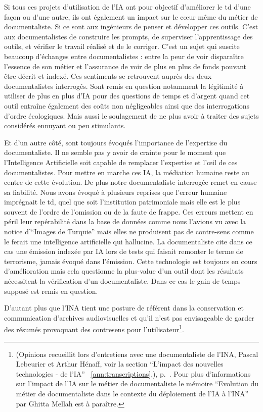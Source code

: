 
Si tous ces projets d'utilisation de l'IA ont pour objectif d'améliorer le \gls{td} d'une façon ou d'une autre, ils ont également un impact sur le cœur même du métier de documentaliste. Si ce sont aux ingénieurs de penser et développer ces outils. C'est aux documentalistes de construire les prompts, de superviser l'apprentissage des outils, et vérifier le travail réalisé et de le corriger. C'est un sujet qui suscite beaucoup d'échanges entre documentalistes : entre la peur de voir disparaître l'essence de son métier et l'assurance de voir de plus en plus de fonds pouvant être décrit et indexé. Ces sentiments se retrouvent auprès des deux documentalistes interrogés. Sont remis en question notamment la légitimité à utiliser de plus en plus d'IA pour des questions de temps et d'argent quand cet outil entraîne également des coûts non négligeables ainsi que des interrogations d'ordre écologiques. Mais aussi le soulagement de ne plus avoir à traiter des sujets considérés ennuyant ou peu stimulants. 

Et d'un autre côté, sont toujours évoqués l'importance de l'expertise du documentaliste. Il ne semble pas y avoir de crainte pour le moment que l'Intelligence Artificielle soit capable de remplacer l'expertise et l’œil de ces documentalistes. Pour mettre en marche ces IA, la médiation humaine reste au centre de cette évolution. De plus notre documentaliste interrogée remet en cause sa fiabilité. Nous avons évoqué à plusieurs reprises que l'erreur humaine imprégnait le \gls{td}, quel que soit l'institution patrimoniale mais elle est le plus souvent de l'ordre de l'omission ou de la faute de frappe. Ces erreurs mettent en péril leur repérabilité dans la base de données comme nous l'avions vu avec la notice d'\enquote{Images de Turquie} mais elles ne produisent pas de contre-sens comme le ferait une intelligence artificielle qui hallucine. La documentaliste cite dans ce cas une émission indexée par IA lors de tests qui faisait remonter le terme de terrorisme, jamais évoqué dans l'émission. Cette technologie est toujours en cours d'amélioration mais cela questionne la plus-value d'un outil dont les résultats nécessitent la vérification d'un documentaliste. Dans ce cas le gain de temps supposé est remis en question. 

D'autant plus que l'INA tient une posture de référent dans la conservation et communication d'archives audiovisuelles et qu'il n'est pas envisageable de garder des résumés provoquant des contresens pour l'utilisateur\footnote{(Opinions recueillit lors d'entretiens avec une documentaliste de l'INA, Pascal Lebeurier et Arthur Hénaff, voir la section \enquote{L'impact des nouvelles technologies - de l'IA} ~\ref{ann:transcriptions},), p.~\pageref{ann:transcriptions}. Pour plus d'informations sur l'impact de l'IA sur le métier de documentaliste le mémoire \enquote{Evolution du métier de documentaliste dans le contexte du déploiement de l'IA à l'INA} par Ghitta Mellah est à paraître.}. 

